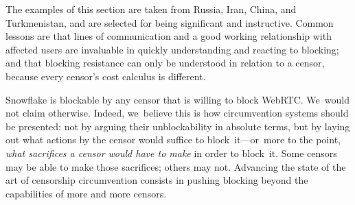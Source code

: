 \documentclass[letterpaper,twocolumn]{article}
\begin{document}
The examples of this section are taken from
Russia, Iran, China, and Turkmenistan,
and are selected for being significant and instructive.
Common lessons are that lines of communication
and a good working relationship
with affected users are invaluable in quickly understanding and reacting to blocking;
and that blocking resistance
can only be understood in relation to a censor,
because every censor's cost calculus is different.

Snowflake is blockable by any censor that is willing to block WebRTC.
We~would not claim otherwise.
Indeed, we~believe this is how circumvention systems
should be presented:
not by arguing their unblockability in absolute terms,
but by laying out
what actions by the censor would suffice to block~it---or~more
to the point,
\emph{what sacrifices a censor would have to make}
in order to block~it.
Some censors may be able to make those sacrifices; others may not.
Advancing the state of the art of censorship circumvention
consists in pushing blocking
beyond the capabilities of more and more censors.
\end{document}
